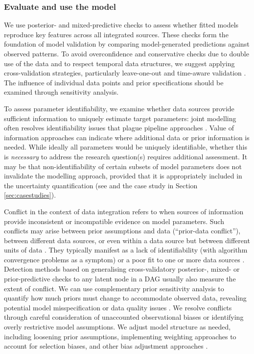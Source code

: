 \documentclass{article}
\begin{document}
\subsubsection{Evaluate and use the model}

We use posterior- and mixed-predictive checks \citep{rubin1984bayesianly,gelman1995bayesian} to assess whether fitted models reproduce key features across all integrated sources.
These checks form the foundation of model validation by comparing model-generated predictions against observed patterns.
To avoid overconfidence and conservative checks due to double use of the data and to respect temporal data structures, we suggest applying cross-validation strategies, particularly leave-one-out and time-aware validation \citep{dautel2023validation}.
The influence of individual data points and prior specifications should be examined through sensitivity analysis.

To assess parameter identifiability, we examine whether data sources provide sufficient information to uniquely estimate target parameters: joint modelling often resolves identifiability issues that plague pipeline approaches \citep{lison2024generative, russell2024combined}. Value of information approaches \citep{jackson2019value,heath2024value} can indicate where additional data or prior information is needed. While ideally all parameters would be uniquely identifiable, whether this is \emph{necessary} to address the research question(s) requires additional assessment. It may be that non-identifiability of certain subsets of model parameters does not invalidate the modelling approach, provided that it is appropriately included in the uncertainty quantification (see \cite{cobelli1980,yan2017} and the case study in Section \ref{sec:casestudies}).

Conflict in the context of data integration refers to when sources of information provide inconsistent or incompatible evidence on model parameters. Such conflicts may arise between prior assumptions and data (``prior-data conflict''), between different data sources, or even within a data source but between different units of data \citep{presanis2013conflict,thomas2015quantifying,yang2025detecting}.
They typically manifest as a lack of identifiability (with algorithm convergence problems as a symptom) or a poor fit to one or more data sources \citep{presanis2013conflict,deangelis2018analysing}. Detection methods based on generalising cross-validatory posterior-, mixed- or prior-predictive checks to any latent node in a DAG \citep{presanis2013conflict,yang2025detecting} usually also measure the extent of conflict. We can use complementary prior sensitivity analysis to quantify how much priors must change to accommodate observed data, revealing potential model misspecification or data quality issues \citep{Roos2015, Kallioinen2024, yang2025detecting}. We resolve conflicts through careful consideration of unaccounted observational biases or identifying overly restrictive model assumptions. We adjust model structure as needed, including loosening prior assumptions, implementing weighting approaches to account for selection biases, and other bias adjustment approaches \citep{deangelis2018analysing}.
\end{document}
